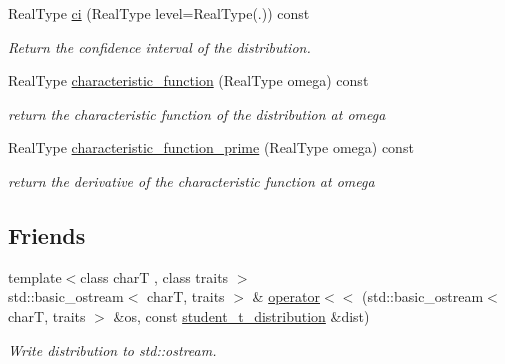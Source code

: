 \begin{DoxyCompactItemize}
\mbox{\label{structstudent__t__distribution_acd9350d5f25a95f8120333237f810f6b}} 
Real\+Type \mbox{\hyperlink{structstudent__t__distribution_acd9350d5f25a95f8120333237f810f6b}{ci}} (Real\+Type level=Real\+Type(.)) const
\begin{DoxyCompactList}\small\item\em Return the confidence interval of the distribution. \end{DoxyCompactList}\item 
\mbox{\label{structstudent__t__distribution_a16dd6f257065331e72960fb23c9c208e}} 
Real\+Type \mbox{\hyperlink{structstudent__t__distribution_a16dd6f257065331e72960fb23c9c208e}{characteristic\+\_\+function}} (Real\+Type omega) const
\begin{DoxyCompactList}\small\item\em return the characteristic function of the distribution at omega \end{DoxyCompactList}\item 
\mbox{\label{structstudent__t__distribution_ab757b6e129b2babe78af3d9105c4eed8}} 
Real\+Type \mbox{\hyperlink{structstudent__t__distribution_ab757b6e129b2babe78af3d9105c4eed8}{characteristic\+\_\+function\+\_\+prime}} (Real\+Type omega) const
\begin{DoxyCompactList}\small\item\em return the derivative of the characteristic function at omega \end{DoxyCompactList}\end{DoxyCompactItemize}
\subsection*{Friends}
\begin{DoxyCompactItemize}
\item 
\mbox{\label{structstudent__t__distribution_aee4aaa9b82b8248166aced167a23798c}} 
{\footnotesize template$<$class charT , class traits $>$ }\\std\+::basic\+\_\+ostream$<$ charT, traits $>$ \& \mbox{\hyperlink{structstudent__t__distribution_aee4aaa9b82b8248166aced167a23798c}{operator$<$$<$}} (std\+::basic\+\_\+ostream$<$ charT, traits $>$ \&os, const \mbox{\hyperlink{structstudent__t__distribution}{student\+\_\+t\+\_\+distribution}} \&dist)
\begin{DoxyCompactList}\small\item\em Write distribution to std\+::ostream. \end{DoxyCompactList}\end{DoxyCompactItemize}


